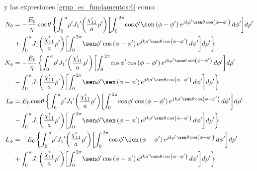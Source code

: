 y las expresiones \eqref{grup_ec_fundamentos:6} como:
\begin{subequations}
\label{grup_ec_apC:17}
\begin{align}
N_{\theta} &= - \dfrac{E_0}{\eta}\cos\theta\left\{\int_{0}^{\,a}\!\rho '{J_1}'\!\left(\frac{\chi '_{11}}{a}\rho '\right)\!\left[\int_{0}^{\,2\pi}\!\cos\phi '\sen\left(\phi - \phi '\right)e^{jk\rho '\sen\theta\cos\left(\phi - \phi '\right)}\,d\phi '\right]\!d\rho '\right.\notag\\
&\left.+\int_{0}^{\,a}\!J_1\!\left(\frac{\chi '_{11}}{a}\rho '\right)\!\left[\int_{0}^{\,2\pi}\!\sen\phi '\cos\left(\phi - \phi '\right)e^{jk\rho '\sen\theta\cos\left(\phi - \phi '\right)}\,d\phi '\right]\!d\rho '\right\}
\label{ec_apC:73}\\
N_{\phi} &= - \dfrac{E_0}{\eta}\left\{\int_{0}^{\,a}\!\rho '{J_1}'\!\left(\frac{\chi '_{11}}{a}\rho '\right)\!\left[\int_{0}^{\,2\pi}\!\cos\phi '\cos\left(\phi - \phi '\right)e^{jk\rho '\sen\theta\cos\left(\phi - \phi '\right)}\,d\phi '\right]\!d\rho '\right.\notag\\
&\left.-\int_{0}^{\,a}\!J_1\!\left(\frac{\chi '_{11}}{a}\rho '\right)\!\left[\int_{0}^{\,2\pi}\!\sen\phi '\sen\left(\phi - \phi '\right)e^{jk\rho '\sen\theta\cos\left(\phi - \phi '\right)}\,d\phi '\right]\!d\rho '\right\}
\label{ec_apC:74}\\
L_{\theta} &= E_0\cos\theta\left\{\int_{0}^{\,a}\!\rho '{J_1}'\!\left(\frac{\chi '_{11}}{a}\rho '\right)\!\left[\int_{0}^{\,2\pi}\!\cos\phi '\cos\left(\phi - \phi '\right)e^{jk\rho '\sen\theta\cos\left(\phi - \phi '\right)}\,d\phi '\right]\!d\rho '\right.\notag\\
&\left.-\int_{0}^{\,a}\!J_1\!\left(\frac{\chi '_{11}}{a}\rho '\right)\!\left[\int_{0}^{\,2\pi}\!\sen\phi '\sen\left(\phi - \phi '\right)e^{jk\rho '\sen\theta\cos\left(\phi - \phi '\right)}\,d\phi '\right]\!d\rho '\right\}
\label{ec_apC:75}\\
L_{\phi} &= - E_0\left\{\int_{0}^{\,a}\!\rho '{J_1}'\!\left(\frac{\chi '_{11}}{a}\rho '\right)\!\left[\int_{0}^{\,2\pi}\!\cos\phi '\sen\left(\phi - \phi '\right)e^{jk\rho '\sen\theta\cos\left(\phi - \phi '\right)}\,d\phi '\right]\!d\rho '\right.\notag\\
&\left.+\int_{0}^{\,a}\!J_1\!\left(\frac{\chi '_{11}}{a}\rho '\right)\!\left[\int_{0}^{\,2\pi}\!\sen\phi '\cos\left(\phi - \phi '\right)e^{jk\rho '\sen\theta\cos\left(\phi - \phi '\right)}\,d\phi '\right]\!d\rho '\right\}
\label{ec_apC:76}
\end{align}
\end{subequations}
